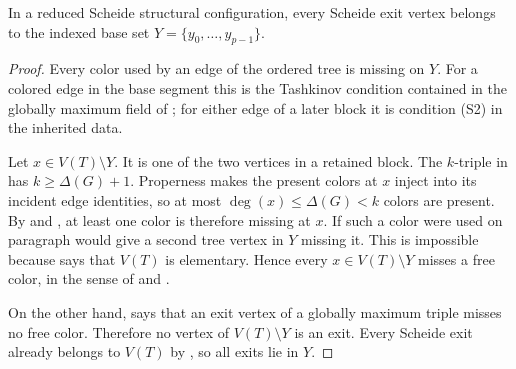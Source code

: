 \begin{lemma}
In a reduced Scheide structural configuration, every Scheide exit vertex
belongs to the indexed base set $Y=\{y_0,\ldots,y_{p-1}\}$.
\end{lemma}
\begin{proof}
Every color used by an edge of the ordered tree is missing on $Y$.  For a
colored edge in the base segment this is the Tashkinov condition contained
in the globally maximum field of
; for either edge of a later block it
is condition (S2) in the inherited
 data.

Let $x\in V(T)\setminus Y$.  It is one of the two vertices in a retained
block.  The $k$-triple in  has
$k\geq\Delta(G)+1$.  Properness makes the present colors at $x$ inject into
its incident edge identities, so at most $\deg(x)\leq\Delta(G)<k$ colors
are present.  By  and , at
least one color is therefore missing at $x$.  If such a color were used on
paragraph would give a second tree vertex in $Y$ missing it.  This is
impossible because  says that $V(T)$ is
elementary.  Hence every $x\in V(T)\setminus Y$ misses a free color, in the
sense of  and
.

On the other hand,  says that an exit vertex of
a globally maximum triple misses no free color.  Therefore no vertex of
$V(T)\setminus Y$ is an exit.  Every Scheide exit already belongs to
$V(T)$ by , so all exits lie in $Y$.
\end{proof}

